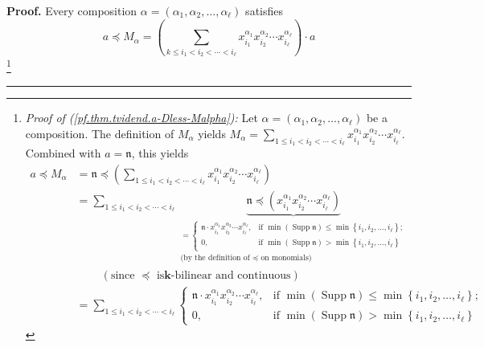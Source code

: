 \documentclass[numbers=enddot,12pt,final,onecolumn,notitlepage,abstracton]{scrartcl}%
\theoremstyle{definition}
\newenvironment{proof}[1][Proof]{\noindent\textbf{#1.} }{\ \rule{0.5em}{0.5em}}
\newenvironment{verlong}{}{}
\let\sumnonlimits\sum
\renewcommand{\sum}{\sumnonlimits\limits}
\begin{document}
\begin{verlong}
\begin{proof}
Every composition $\alpha=\left(  \alpha_{1},\alpha_{2},\ldots,\alpha_{\ell
}\right)  $ satisfies%
\begin{equation}
a\left.  \preceq\right.  M_{\alpha}=\left(  \sum_{k\leq i_{1}<i_{2}%
<\cdots<i_{\ell}}x_{i_{1}}^{\alpha_{1}}x_{i_{2}}^{\alpha_{2}}\cdots
x_{i_{\ell}}^{\alpha_{\ell}}\right)  \cdot a
\label{pf.thm.tvidend.a-Dless-Malpha}%
\end{equation}
\footnote{\textit{Proof of (\ref{pf.thm.tvidend.a-Dless-Malpha}):} Let
$\alpha=\left(  \alpha_{1},\alpha_{2},\ldots,\alpha_{\ell}\right)  $ be a
composition. The definition of $M_{\alpha}$ yields $M_{\alpha}=\sum_{1\leq
i_{1}<i_{2}<\cdots<i_{\ell}}x_{i_{1}}^{\alpha_{1}}x_{i_{2}}^{\alpha_{2}}\cdots
x_{i_{\ell}}^{\alpha_{\ell}}$. Combined with $a=\mathfrak{n}$, this yields%
\begin{align*}
a\left.  \preceq\right.  M_{\alpha}  &  =\mathfrak{n}\left.  \preceq\right.
\left(  \sum_{1\leq i_{1}<i_{2}<\cdots<i_{\ell}}x_{i_{1}}^{\alpha_{1}}%
x_{i_{2}}^{\alpha_{2}}\cdots x_{i_{\ell}}^{\alpha_{\ell}}\right) \\
&  =\sum_{1\leq i_{1}<i_{2}<\cdots<i_{\ell}}\underbrace{\mathfrak{n}\left.
\preceq\right.  \left(  x_{i_{1}}^{\alpha_{1}}x_{i_{2}}^{\alpha_{2}}\cdots
x_{i_{\ell}}^{\alpha_{\ell}}\right)  }_{\substack{=
\begin{cases}
\mathfrak{n}\cdot x_{i_{1}}^{\alpha_{1}}x_{i_{2}}^{\alpha_{2}}\cdots
x_{i_{\ell}}^{\alpha_{\ell}}, & \text{if }\min\left(  \operatorname*{Supp}%
\mathfrak{n}\right)  \leq\min\left\{  i_{1},i_{2},\ldots,i_{\ell}\right\}  ;\\
0, & \text{if }\min\left(  \operatorname*{Supp}\mathfrak{n}\right)
>\min\left\{  i_{1},i_{2},\ldots,i_{\ell}\right\}
\end{cases}
\\\text{(by the definition of }\left.  \preceq\right.  \text{ on monomials)}%
}}\\
&  \ \ \ \ \ \ \ \ \ \ \left(  \text{since }\left.  \preceq\right.  \text{ is
}\mathbf{k}\text{-bilinear and continuous}\right) \\
&  =\sum_{1\leq i_{1}<i_{2}<\cdots<i_{\ell}}
\begin{cases}
\mathfrak{n}\cdot x_{i_{1}}^{\alpha_{1}}x_{i_{2}}^{\alpha_{2}}\cdots
x_{i_{\ell}}^{\alpha_{\ell}}, & \text{if }\min\left(  \operatorname*{Supp}%
\mathfrak{n}\right)  \leq\min\left\{  i_{1},i_{2},\ldots,i_{\ell}\right\}  ;\\
0, & \text{if }\min\left(  \operatorname*{Supp}\mathfrak{n}\right)
>\min\left\{  i_{1},i_{2},\ldots,i_{\ell}\right\}

\end{cases}
\end{align*}}
\end{proof}
\end{verlong}
\end{document}
